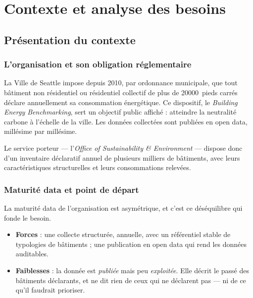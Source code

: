 \section{Contexte et analyse des besoins}

\subsection{Présentation du contexte}

\subsubsection*{L'organisation et son obligation réglementaire}

La Ville de Seattle impose depuis 2010, par ordonnance municipale, que tout
bâtiment non résidentiel ou résidentiel collectif de plus de
\num{20000}~pieds carrés déclare annuellement sa consommation énergétique. Ce
dispositif, le \emph{Building Energy Benchmarking}, sert un objectif public
affiché : atteindre la neutralité carbone à l'échelle de la ville. Les données
collectées sont publiées en open data, millésime par millésime.

Le service porteur — l'\emph{Office of Sustainability \& Environment} — dispose
donc d'un inventaire déclaratif annuel de plusieurs milliers de bâtiments, avec
leurs caractéristiques structurelles et leurs consommations relevées.

\subsubsection*{Maturité data et point de départ}

La maturité data de l'organisation est asymétrique, et c'est ce déséquilibre qui
fonde le besoin.

\begin{itemize}[leftmargin=1.4em,itemsep=0.25em]
  \item \textbf{Forces} : une collecte structurée, annuelle, avec un référentiel
        stable de typologies de bâtiments ; une publication en open data qui
        rend les données auditables.
  \item \textbf{Faiblesses} : la donnée est \emph{publiée} mais peu
        \emph{exploitée}. Elle décrit le passé des bâtiments déclarants, et ne
        dit rien de ceux qui ne déclarent pas — ni de ce qu'il faudrait
        prioriser.
\end{itemize}

